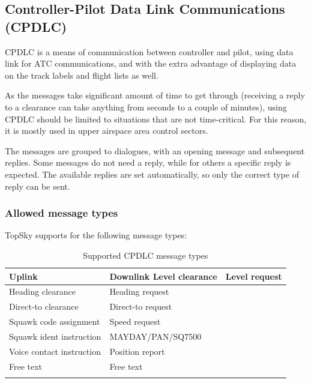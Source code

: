 \documentclass[a4paper,oneside,11pt]{memoir}
\begin{document}
\subsection{Controller-Pilot Data Link Communications (CPDLC)}
\label{cpdlc}

CPDLC is a means of communication between controller and pilot, using data link for ATC communications, and with the extra advantage of displaying data on the track labels and flight lists as well.

\bigskip

As the messages take significant amount of time to get through (receiving a reply to a clearance can take anything from seconds to a couple of minutes), using CPDLC should be limited to situations that are not time-critical. For this reason, it is mostly used in upper airspace area control sectors.

\bigskip

The messages are grouped to dialogues, with an opening message and subsequent replies. Some messages do not need a reply, while for others a specific reply is expected. The available replies are set automatically, so only the correct type of reply can be sent.

\subsubsection{Allowed message types}
\label{cpdlc:amt}

TopSky supports for the following message types:

\begin{longtable}{|p{4.5cm}|p{4.5cm}|}
  \hline
  \textbf{Uplink}             & \textbf{Downlink} \endhead \hline
  Level clearance             & Level request     \\ \hline
  Heading clearance           & Heading request   \\ \hline
  Direct-to clearance         & Direct-to request \\ \hline
  Squawk code assignment      & Speed request     \\ \hline
  Squawk ident instruction    & MAYDAY/PAN/SQ7500 \\ \hline
  Voice contact instruction   & Position report   \\ \hline
  Free text                   & Free text         \\ \hline
  \caption{Supported CPDLC message types}
\end{longtable}
\end{document}
